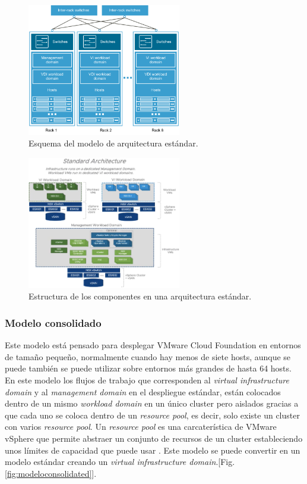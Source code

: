 \begin{figure}[h!]
  \centering
  \includegraphics[width=0.6\textwidth]{imaxes/conceptosPrevios/arquitect_standarCF.png}
  \caption{Esquema del modelo de arquitectura estándar.}
  \label{fig:modelostandard}
\end{figure}

\begin{figure}[h!]
  \centering
  \includegraphics[width=0.6\textwidth]{imaxes/conceptosPrevios/standardArch.png}
  \caption{Estructura de los componentes en una arquitectura estándar.}
  \label{fig:standardarch}
\end{figure}
\FloatBarrier
\subsubsection{Modelo consolidado}
Este modelo está pensado para desplegar VMware Cloud Foundation en entornos de tamaño pequeño, normalmente cuando hay menos de siete hosts, aunque se puede también se puede utilizar sobre entornos más grandes de hasta 64 hosts. En este modelo los flujos de trabajo que corresponden al \textit{virtual infrastructure domain} y al \textit{management domain} en el despliegue estándar, están colocados dentro de un mismo \textit{workload domain} en un único cluster pero aislados gracias a que cada uno se coloca dentro de un \textit{resource pool}, es decir, solo existe un cluster con varios \textit{resource pool}. Un \textit{resource pool} es una carcaterística de VMware vSphere que permite abstraer un conjunto de recursos de un cluster estableciendo unos límites de capacidad que puede usar \cite{resourcePool}. Este modelo se puede convertir en un modelo estándar creando un \textit{virtual infrastructure domain}.[Fig. \ref{fig:modeloconsolidated}].

